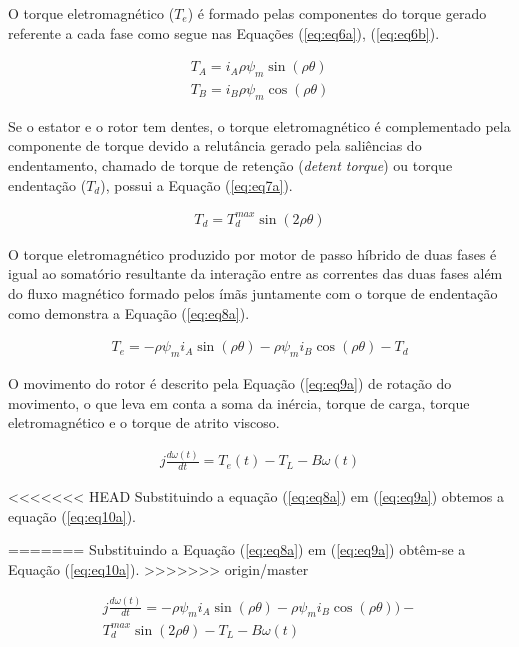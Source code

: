 O torque eletromagnético ($T_e$) é formado pelas componentes do torque gerado referente a cada fase como segue nas Equações (\ref{eq:eq6a}), (\ref{eq:eq6b}).

\begin{eqnarray}
\label{eq:eq6a}
T_A = i_A \rho \psi_m \sin(\rho \theta)\\
\label{eq:eq6b}
T_B = i_B \rho \psi_m \cos(\rho \theta) 
\end{eqnarray}

Se o estator e o rotor tem dentes, o torque eletromagnético é complementado pela componente de torque devido a relutância gerado pela saliências do endentamento, chamado de torque de retenção (\textit{detent torque}) ou torque endentação ($T_d$), possui a Equação (\ref{eq:eq7a}).

\begin{eqnarray}
\label{eq:eq7a}
T_d = T_{d}^{max}\sin(2 \rho \theta)
\end{eqnarray}

O torque eletromagnético produzido por motor de passo híbrido de duas fases é igual ao somatório resultante da interação entre as correntes das duas fases além do fluxo magnético formado pelos ímãs juntamente com o torque de endentação como demonstra a Equação (\ref{eq:eq8a}).

\begin{eqnarray}
	\label{eq:eq8a}
	T_e = - \rho \psi_m i_A \sin(\rho \theta) - \rho \psi_m i_B \cos(\rho \theta ) - T_d
\end{eqnarray}

O movimento do rotor é descrito pela Equação (\ref{eq:eq9a}) de rotação do movimento, o que leva em conta a soma da inércia, torque de carga, torque eletromagnético e o torque de atrito viscoso.

\begin{eqnarray}
\label{eq:eq9a}
j\frac{d\omega(t)}{dt} = T_e(t) - T_L - B\omega(t)
\end{eqnarray}

<<<<<<< HEAD
Substituindo a equação (\ref{eq:eq8a}) em (\ref{eq:eq9a}) obtemos a equação (\ref{eq:eq10a}).

\scriptsize
=======
Substituindo a Equação (\ref{eq:eq8a}) em (\ref{eq:eq9a}) obtêm-se a Equação (\ref{eq:eq10a}).
>>>>>>> origin/master

\begin{eqnarray}
\label{eq:eq10a}
j\frac{d\omega(t)}{dt} = - \rho \psi_m i_A \sin(\rho \theta) - \rho \psi_m i_B \cos(\rho \theta ) )-\\ \nonumber T_{d}^{max}\sin(2 \rho \theta)  - T_L - B\omega(t)
\end{eqnarray}

